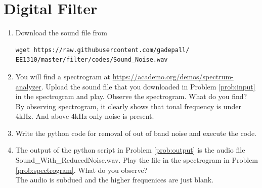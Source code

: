 \documentclass[journal,12pt,twocolumn]{IEEEtran}
\renewcommand\thesection{\arabic{section}}
\begin{document}
\section{Digital Filter}
\begin{enumerate}[label=\thesection.\arabic*
,ref=\thesection.\theenumi]
\item
\label{prob:input}
Download the sound file from  
\begin{lstlisting}
wget https://raw.githubusercontent.com/gadepall/ 
EE1310/master/filter/codes/Sound_Noise.wav
\end{lstlisting}
\item
\label{prob:spectrogram}
You will find a spectrogram at \href{https://academo.org/demos/spectrum-analyzer}{\url{https://academo.org/demos/spectrum-analyzer}}. 
%
Upload the sound file that you downloaded in Problem \ref{prob:input} in the spectrogram  and play.  Observe the spectrogram. What do you find?
\\
%
\solution 
By observing spectrogram, it clearly shows that tonal frequency is under 4kHz. And above 4kHz only noise is present.
\item \label{prob:output}
Write the python code for removal of out of band noise and execute the code.
\\
\solution

%
\item
The output of the python script in Problem \ref{prob:output} is the audio file Sound\_With\_ReducedNoise.wav. Play the file in the spectrogram in Problem \ref{prob:spectrogram}. What do you observe?
\\
\solution The audio is subdued and the higher frequenices are just blank.
\end{enumerate}
\end{document}
